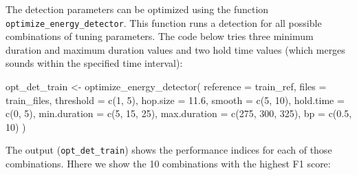 \documentclass[
]{article}
\newenvironment{Shaded}{\begin{snugshade}}{\end{snugshade}}
\newcommand{\AttributeTok}[1]{\textcolor[rgb]{0.77,0.63,0.00}{#1}}
\newcommand{\CommentTok}[1]{\textcolor[rgb]{0.56,0.35,0.01}{\textit{#1}}}
\newcommand{\ConstantTok}[1]{\textcolor[rgb]{0.00,0.00,0.00}{#1}}
\newcommand{\DecValTok}[1]{\textcolor[rgb]{0.00,0.00,0.81}{#1}}
\newcommand{\FloatTok}[1]{\textcolor[rgb]{0.00,0.00,0.81}{#1}}
\newcommand{\FunctionTok}[1]{\textcolor[rgb]{0.00,0.00,0.00}{#1}}
\newcommand{\NormalTok}[1]{#1}
\newcommand{\OtherTok}[1]{\textcolor[rgb]{0.56,0.35,0.01}{#1}}
\newcommand{\SpecialCharTok}[1]{\textcolor[rgb]{0.00,0.00,0.00}{#1}}
\begin{document}
The detection parameters can be optimized using the function
\texttt{optimize\_energy\_detector}. This function runs a detection for
all possible combinations of tuning parameters. The code below tries
three minimum duration and maximum duration values and two hold time
values (which merges sounds within the specified time interval):

\begin{Shaded}
\begin{Highlighting}[]
\NormalTok{opt\_det\_train }\OtherTok{\textless{}{-}} \FunctionTok{optimize\_energy\_detector}\NormalTok{(}
  \AttributeTok{reference =}\NormalTok{ train\_ref, }
  \AttributeTok{files =}\NormalTok{ train\_files, }
  \AttributeTok{threshold =} \FunctionTok{c}\NormalTok{(}\DecValTok{1}\NormalTok{, }\DecValTok{5}\NormalTok{), }
  \AttributeTok{hop.size =} \FloatTok{11.6}\NormalTok{, }
  \AttributeTok{smooth =} \FunctionTok{c}\NormalTok{(}\DecValTok{5}\NormalTok{, }\DecValTok{10}\NormalTok{), }
  \AttributeTok{hold.time =} \FunctionTok{c}\NormalTok{(}\DecValTok{0}\NormalTok{, }\DecValTok{5}\NormalTok{), }
  \AttributeTok{min.duration =} \FunctionTok{c}\NormalTok{(}\DecValTok{5}\NormalTok{, }\DecValTok{15}\NormalTok{, }\DecValTok{25}\NormalTok{), }
  \AttributeTok{max.duration =} \FunctionTok{c}\NormalTok{(}\DecValTok{275}\NormalTok{, }\DecValTok{300}\NormalTok{, }\DecValTok{325}\NormalTok{), }
  \AttributeTok{bp =} \FunctionTok{c}\NormalTok{(}\FloatTok{0.5}\NormalTok{, }\DecValTok{10}\NormalTok{)}
\NormalTok{)}
\end{Highlighting}
\end{Shaded}

The output (\texttt{opt\_det\_train}) shows the performance indices for
each of those combinations. Hhere we show the 10 combinations with the
highest F1 score:

\begin{Shaded}
\end{Shaded}
\end{document}
